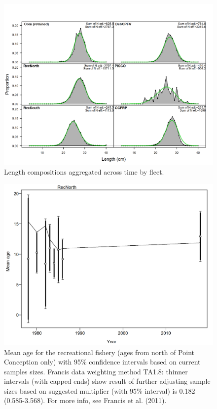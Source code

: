 \documentclass[12pt,]{article}
\begin{document}
\FloatBarrier 

\begin{figure}
\centering
\includegraphics{r4ss/plots_mod1/comp_lenfit__aggregated_across_time.png}
\caption{Length compositions aggregated across time by fleet.
\label{fig:comp_lenfit__aggregated_across_time}}
\end{figure}

\FloatBarrier

\begin{figure}
\centering
\includegraphics{r4ss/plots_mod1/comp_condAALfit_data_weighting_TA1.8_condAgeRecNorth.png}
\caption{Mean age for the recreational fishery (ages from north of Point
Conception only) with 95\% confidence intervals based on current samples
sizes. Francis data weighting method TA1.8: thinner intervals (with
capped ends) show result of further adjusting sample sizes based on
suggested multiplier (with 95\% interval) is 0.182 (0.585-3.568). For
more info, see Francis et al. (2011).
\label{fig:comp_condAALfit_data_weighting_TA1.8_condAgeRecNorth}}
\end{figure}
\end{document}
